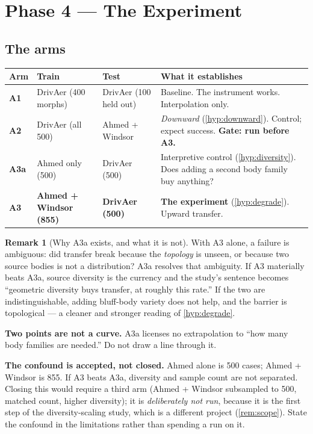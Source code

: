 \documentclass[10pt,a4paper]{article}
\theoremstyle{definition}
\newtheorem{remark}{Remark}[section]
\begin{document}
\section{Phase 4 --- The Experiment}
\label{sec:arms}

\subsection{The arms}

\begin{center}\small
\begin{tabular}{@{}p{1.1cm}p{3.4cm}p{3.0cm}p{7.0cm}@{}}
\toprule
\textbf{Arm} & \textbf{Train} & \textbf{Test} & \textbf{What it establishes} \\
\midrule
\textbf{A1} & DrivAer (400 morphs) & DrivAer (100 held out)
  & Baseline. The instrument works. Interpolation only. \\[0.3em]
\textbf{A2} & DrivAer (all 500) & Ahmed + Windsor
  & \emph{Downward} (\cref{hyp:downward}). Control; expect success.
    \textbf{Gate: run before A3.} \\[0.3em]
\textbf{A3a} & Ahmed only (500) & DrivAer (500)
  & Interpretive control (\cref{hyp:diversity}). Does adding a second body family
    buy anything? \\[0.3em]
\textbf{A3} & \textbf{Ahmed + Windsor (855)} & \textbf{DrivAer (500)}
  & \textbf{The experiment} (\cref{hyp:degrade}). Upward transfer. \\
\bottomrule
\end{tabular}
\end{center}

\begin{remark}[Why A3a exists, and what it is not]
\label{rem:a3a}
With A3 alone, a failure is ambiguous: did transfer break because the \emph{topology}
is unseen, or because two source bodies is not a distribution? A3a resolves that
ambiguity. If A3 materially beats A3a, source diversity is the currency and the study's
sentence becomes ``geometric diversity buys transfer, at roughly this rate.'' If the two
are indistinguishable, adding bluff-body variety does not help, and the barrier is
topological --- a cleaner and stronger reading of \cref{hyp:degrade}.

\textbf{Two points are not a curve.} A3a licenses no extrapolation to ``how many body
families are needed.'' Do not draw a line through it.

\textbf{The confound is accepted, not closed.} Ahmed alone is 500 cases; Ahmed +
Windsor is 855. If A3 beats A3a, diversity and sample count are not separated. Closing
this would require a third arm (Ahmed + Windsor subsampled to 500, matched count,
higher diversity); it is \emph{deliberately not run}, because it is the first step of
the diversity-scaling study, which is a different project (\cref{rem:scope}). State the
confound in the limitations rather than spending a run on it.
\end{remark}
\end{document}
